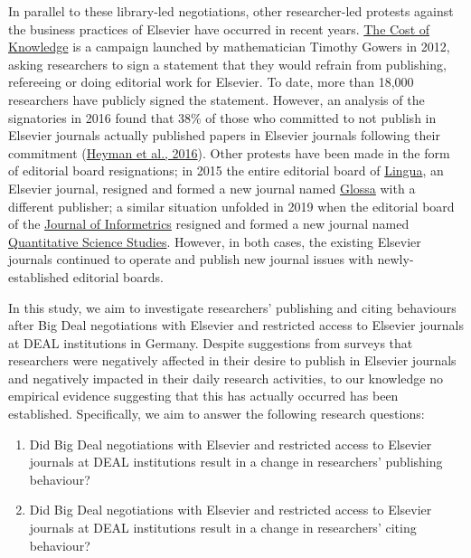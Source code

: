 \documentclass[
]{article}
\providecommand{\tightlist}{%
  \setlength{\itemsep}{0pt}\setlength{\parskip}{0pt}}
\begin{document}
In parallel to these library-led negotiations, other researcher-led protests against the business practices of Elsevier have occurred in recent years. \href{http://thecostofknowledge.com/}{The Cost of Knowledge} is a campaign launched by mathematician Timothy Gowers in 2012, asking researchers to sign a statement that they would refrain from publishing, refereeing or doing editorial work for Elsevier. To date, more than 18,000 researchers have publicly signed the statement. However, an analysis of the signatories in 2016 found that 38\% of those who committed to not publish in Elsevier journals actually published papers in Elsevier journals following their commitment (\href{https://doi.org/10.3389/frma.2016.00007}{Heyman et al., 2016}). Other protests have been made in the form of editorial board resignations; in 2015 the entire editorial board of \href{https://www.journals.elsevier.com/lingua}{Lingua}, an Elsevier journal, resigned and formed a new journal named \href{https://www.glossa-journal.org/}{Glossa} with a different publisher; a similar situation unfolded in 2019 when the editorial board of the \href{https://www.journals.elsevier.com/journal-of-informetrics}{Journal of Informetrics} resigned and formed a new journal named \href{https://direct.mit.edu/qss}{Quantitative Science Studies}. However, in both cases, the existing Elsevier journals continued to operate and publish new journal issues with newly-established editorial boards.

In this study, we aim to investigate researchers' publishing and citing behaviours after Big Deal negotiations with Elsevier and restricted access to Elsevier journals at DEAL institutions in Germany. Despite suggestions from surveys that researchers were negatively affected in their desire to publish in Elsevier journals and negatively impacted in their daily research activities, to our knowledge no empirical evidence suggesting that this has actually occurred has been established. Specifically, we aim to answer the following research questions:

\begin{enumerate}
\def\labelenumi{\arabic{enumi}.}
\tightlist
\item
  Did Big Deal negotiations with Elsevier and restricted access to Elsevier journals at DEAL institutions result in a change in researchers' publishing behaviour?
\item
  Did Big Deal negotiations with Elsevier and restricted access to Elsevier journals at DEAL institutions result in a change in researchers' citing behaviour?
\end{enumerate}
\end{document}
